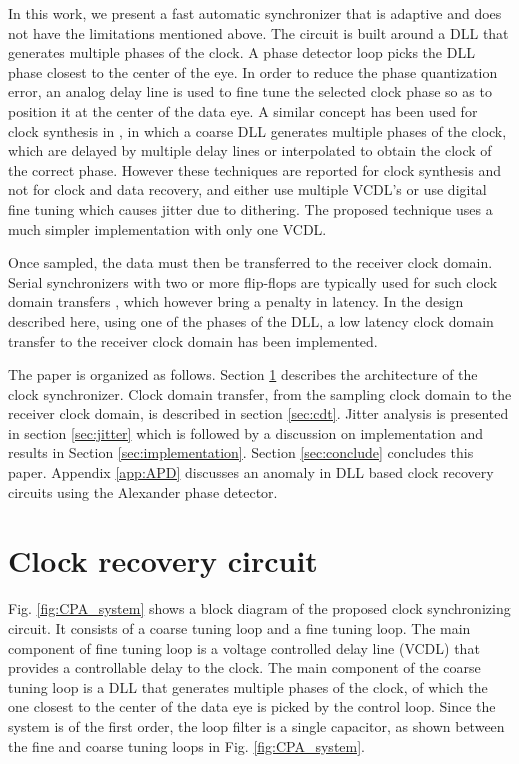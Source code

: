\documentclass[journal,twoside,letterpaper]{IEEEtran}
\begin{document}
In this work, we present a fast automatic synchronizer
that is adaptive and does not have the limitations mentioned above.
The circuit is built around a DLL
that generates multiple phases of the clock.
A phase detector loop picks the DLL phase closest to the center of the eye.
In order to reduce the phase quantization error,
an analog delay line is used to fine tune the selected clock phase
so as to position it at the center of the data eye. 
A similar
concept has been used for clock synthesis in \cite{4vcdl,dualDLL},
in which a coarse DLL generates multiple phases of the clock, which
are delayed by multiple delay lines or interpolated to obtain the
clock of the correct phase. However these techniques are reported
for clock synthesis and not for clock and data recovery, and either use 
multiple VCDL's \cite{4vcdl} or use digital fine tuning which 
causes jitter due to dithering. The proposed technique uses a much simpler
implementation with only one VCDL.

Once sampled, the data must then be transferred to the receiver clock domain.
Serial synchronizers with two or more flip-flops are typically used
for such clock domain transfers \cite{Dally},
which however bring a penalty in latency.
In the design described here, using one of the phases of the DLL,
a low latency clock domain transfer to the receiver clock domain
has been implemented.

The paper is organized as follows. Section \ref{sec:cdr_arch} 
describes the architecture of the clock synchronizer.
Clock domain transfer, from the sampling clock domain to the
receiver clock domain, is described in section \ref{sec:cdt}. Jitter
analysis is presented in section \ref{sec:jitter} which is
followed by a discussion on implementation and results
in Section \ref{sec:implementation}.
Section \ref{sec:conclude} concludes this paper.
Appendix \ref{app:APD} discusses an anomaly
in DLL based clock recovery circuits using the Alexander phase detector.

\section{Clock recovery circuit}
\label{sec:cdr_arch}
Fig. \ref{fig:CPA_system} shows a block diagram
of the proposed clock synchronizing circuit.
It consists of a coarse tuning loop and a fine tuning loop.
The main component of fine tuning loop is a voltage 
controlled delay line (VCDL)
that provides a controllable delay to the clock.
The main component of the coarse tuning loop is a DLL
that generates multiple phases of the clock,
of which the one closest to the center of the data eye
is picked by the control loop.
Since the system is of the first order,
the loop filter is a single capacitor,
as shown between the fine and coarse tuning loops in 
Fig. \ref{fig:CPA_system}. 
\end{document}
